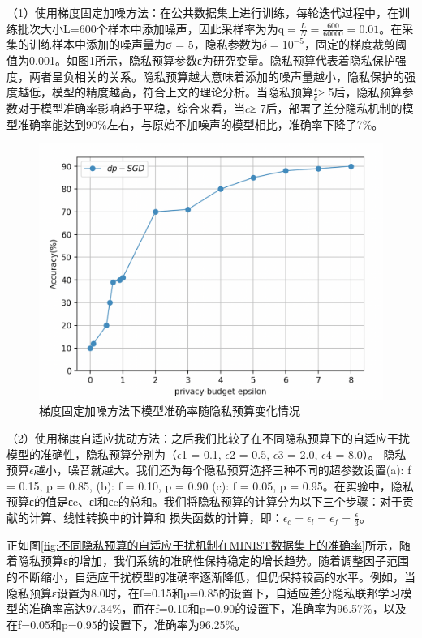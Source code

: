 （1）使用梯度固定加噪方法：在公共数据集上进行训练，每轮迭代过程中，在训练批次大小L=600个样本中添加噪声，因此采样率为为$\mathrm{q}=\frac{L}{N}=\frac{600}{60000}=0.01$。在采集的训练样本中添加的噪声量为σ = 5，隐私参数为$\delta=10^{-5}$，固定的梯度裁剪阈值为0.001。如图\ref{fig:梯度固定加噪方法下模型准确率随隐私预算变化情况}所示，隐私预算参数ε为研究变量。隐私预算代表着隐私保护强度，两者呈负相关的关系。隐私预算越大意味着添加的噪声量越小，隐私保护的强度越低，模型的精度越高，符合上文的理论分析。当隐私预算$\frac{\epsilon}{c}$≥ 5后，隐私预算参数对于模型准确率影响趋于平稳，综合来看，当$c$≥ 7后，部署了差分隐私机制的模型准确率能达到90$\%$左右，与原始不加噪声的模型相比，准确率下降了7$\%$。
\begin{figure}[!hbt]
\centering
  	\includegraphics[scale=0.4]{fig2/C5/梯度固定}%
	\caption{梯度固定加噪方法下模型准确率随隐私预算变化情况}
  	\label{fig:梯度固定加噪方法下模型准确率随隐私预算变化情况} 
\end{figure}

（2）使用梯度自适应扰动方法：之后我们比较了在不同隐私预算下的自适应干扰模型的准确性，隐私预算分别为（$\epsilon$1 = 0.1, $\epsilon$2 = 0.5, $\epsilon$3 = 2.0, $\epsilon$4 = 8.0）。
隐私预算$\epsilon$越小，噪音就越大。我们还为每个隐私预算选择三种不同的超参数设置(a): f = 0.15, p = 0.85, (b): f = 0.10, p = 0.90 (c): f = 0.05, p = 0.95。在实验中，隐私预算ε的值是εc、εl和εc的总和。我们将隐私预算的计算分为以下三个步骤：对于贡献的计算、线性转换中的计算和
损失函数的计算，即：$\epsilon_{c}=\epsilon_{l}=\epsilon_{f}=\frac{\epsilon}{3}$。

正如图\ref{fig:不同隐私预算的自适应干扰机制在MINIST数据集上的准确率}所示，随着隐私预算ε的增加，我们系统的准确性保持稳定的增长趋势。随着调整因子范围的不断缩小，自适应干扰模型的准确率逐渐降低，但仍保持较高的水平。例如，当隐私预算ε设置为8.0时，在f=0.15和p=0.85的设置下，自适应差分隐私联邦学习模型的准确率高达97.34$\%$，而在f=0.10和p=0.90的设置下，准确率为96.57$\%$，以及在f=0.05和p=0.95的设置下，准确率为96.25$\%$。

